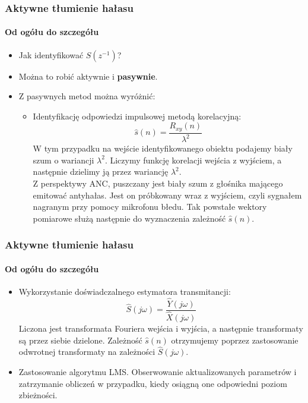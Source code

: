 \documentclass{beamer}
\begin{document}
        \begin{frame}
            \frametitle{Aktywne tłumienie hałasu}
            \framesubtitle{Od ogółu do szczegółu}
            \begin{itemize}
            \item Jak identyfikować $S(z^{-1})$?
            \item Można to robić aktywnie i \textbf{pasywnie}.
            \item Z pasywnych metod można wyróżnić:
            \begin{itemize}
                \item Identyfikację odpowiedzi impulsowej metodą korelacyjną:
                \begin{equation}
                    \hat{s}(n) = \frac{R_{xy}(n)}{\lambda^2}
                    \label{eq::corr}
            \end{equation}
            W tym przypadku na wejście identyfikowanego obiektu podajemy biały szum o wariancji $\lambda^2$. 
            Liczymy funkcję korelacji wejścia z wyjściem, a następnie dzielimy ją przez wariancję $\lambda^2$.
            \\
            Z perspektywy ANC, puszczany jest biały szum z głośnika mającego emitować antyhałas. Jest on próbkowany wraz z wyjściem, 
            czyli sygnałem nagranym przy pomocy mikrofonu błedu. Tak powstałe wektory pomiarowe służą następnie do wyznaczenia 
            zależność $\hat{s}(n)$.

            \end{itemize}
            \end{itemize}
        \end{frame}

        \begin{frame}
            \frametitle{Aktywne tłumienie hałasu}
            \framesubtitle{Od ogółu do szczegółu}
            \begin{itemize}
                \item Wykorzystanie doświadczalnego estymatora transmitancji:
                \begin{equation}
                    \hat{S}(j\omega) = \frac{\hat{Y}(j\omega)}{\hat{X}(j\omega)}
                \end{equation}
                Liczona jest transformata Fouriera wejścia i wyjścia, a następnie transformaty są przez siebie dzielone.
                Zależność $\hat{s}(n)$ otrzymujemy poprzez zastosowanie odwrotnej transformaty na zależności $\hat{S}(j\omega)$.
                \item Zastosowanie algorytmu LMS. Obserwowanie aktualizowanych parametrów i zatrzymanie obliczeń w przypadku, kiedy
                osiągną one odpowiedni poziom zbieżności.
            \end{itemize}
        \end{frame}
\end{document}
